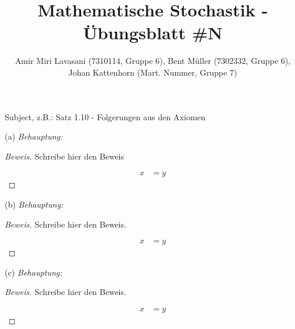 \documentclass[10pt]{article}
\newenvironment{Aufgabe}[2][Aufgabe]{\begin{trivlist}
\item[\hskip \labelsep {\bfseries #1}\hskip \labelsep {\bfseries #2.}]}{\end{trivlist}}
\begin{document}
 
\title{ \textbf{Mathematische Stochastik - Übungsblatt \#N} }

\author{Amir Miri Lavasani (7310114, Gruppe 6), Bent Müller (7302332, Gruppe 6), \\ 
Johan Kattenhorn (Mart. Nummer, Gruppe 7)} \maketitle

 
\begin{Aufgabe}{1}
Subject, z.B.: Satz 1.10 - Folgerungen aus den Axiomen
\end{Aufgabe}

(a) \textit{Behauptung: } 
\begin{proof}[Beweis]
Schreibe hier den Beweis

\begin{align*}
x &= y
\end{align*}

\end{proof}

(b) \textit{Behauptung: }
\begin{proof}[Beweis]
Schreibe hier den Beweis. 

\begin{align*}
x &= y
\end{align*}

\end{proof}

(c) \textit{Behauptung: }
\begin{proof}[Beweis]
Schreibe hier den Beweis. 

\begin{align*}
x &= y
\end{align*}

\end{proof}
\end{document}
